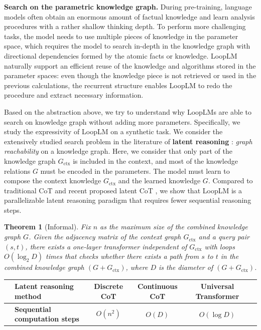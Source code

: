 \documentclass[]{bytedance_seed}
\newcommand{\1}{\mathbf{1}}
\newtheorem{theorem}{Theorem}
\newcommand{\ut}{LoopLM}
\begin{document}
{\textbf{Search on the parametric knowledge graph.} During pre-training, language models often obtain an enormous amount of factual knowledge and learn analysis procedures with a rather shallow thinking depth. To perform more challenging tasks, the model needs to use multiple pieces of knowledge in the parameter space, which requires the model to search in-depth in the knowledge graph with directional dependencies formed by the atomic facts or knowledge. \ut{} naturally support an efficient reuse of the knowledge and algorithms stored in the parameter spaces: even though the knowledge piece is not retrieved or used in the previous calculations, the recurrent structure enables \ut{} to redo the procedure and extract necessary information.

Based on the abstraction above, we try to understand why \ut{}s are able to search on knowledge graph without adding more parameters. Specifically, we study the expressivity of \ut{} on a synthetic task. We consider the extensively studied search problem in the literature of \textbf{latent reasoning} \cite{hao2024training, zhu2025reasoning, zhong2025understanding}: \textit{graph reachability} on a knowledge graph. Here, we consider that only part of the knowledge graph $G_{\text{ctx}}$ is included in the context, and most of the knowledge relations $G$ must be encoded in the parameters. The model must learn to compose the context knowledge $G_{\text{ctx}}$ and the learned knowledge $G$. Compared to traditional CoT and recent proposed latent CoT \cite{zhu2025reasoning, hao2024training}, we show that \ut{} is a parallelizable latent reasoning paradigm that requires fewer sequential reasoning steps.
\begin{theorem}[Informal]
    Fix $n$ as the maximum size of the combined knowledge graph $G$. Given the adjacency matrix of the context graph $G_{\text{ctx}}$ and a query pair $(s,t)$, there exists a one-layer transformer independent of $G_{\text{ctx}}$ with loops $O(\log_2 D)$ times that checks whether there exists a path from $s$ to $t$ in the combined knowledge graph $(G+G_{\text{ctx}})$, where $D$ is the diameter of $(G+G_{\text{ctx}})$.
    \label{thm:ut_graph_connectivity}
\end{theorem}
\begin{table}[ht]
\centering
    \vspace{-7pt}
    \begin{tabular}{@{}cl|cccc@{}}
        \toprule
        &\textbf{Latent reasoning method} & {Discrete CoT} & Continuous CoT & Universal Transformer \\
        \midrule
        &\textbf{Sequential computation steps} & {$O(n^2)$} & {$O(D)$} & {$O(\log D)$} \\
        \bottomrule
    \end{tabular}
\end{table}

}
\end{document}
